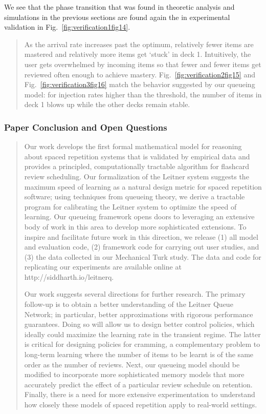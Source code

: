 We see that the phase transition that was found in theoretic analysis
and simulations in the previous sections are found again the in
experimental validation in Fig.~\ref{fig:verification1fig14}.

\begin{quote}
As the arrival rate increases past the optimum, relatively fewer items
are mastered and relatively more items get `stuck' in deck 1.
Intuitively, the user gets overwhelmed by incoming items so that fewer
and fewer items get reviewed often enough to achieve mastery.
Fig.~\ref{fig:verification2fig15} and Fig.~\ref{fig:verification3fig16}
match the behavior suggested by our queueing model: for injection rates
higher than the threshold, the number of items in deck 1 blows up while
the other decks remain stable.
\end{quote}

\subsubsection{Paper Conclusion and Open
Questions}\label{paper-conclusion-and-open-questions}

\begin{quote}
Our work develops the first formal mathematical model for reasoning
about spaced repetition systems that is validated by empirical data and
provides a principled, computationally tractable algorithm for flashcard
review scheduling. Our formalization of the Leitner system suggests the
maximum speed of learning as a natural design metric for spaced
repetition software; using techniques from queueing theory, we derive a
tractable program for calibrating the Leitner system to optimize the
speed of learning. Our queueing framework opens doors to leveraging an
extensive body of work in this area to develop more sophisticated
extensions. To inspire and facilitate future work in this direction, we
release (1) all model and evaluation code, (2) framework code for
carrying out user studies, and (3) the data collected in our Mechanical
Turk study. The data and code for replicating our experiments are
available online at http://siddharth.io/leitnerq.

Our work suggests several directions for further research. The primary
follow-up is to obtain a better understanding of the Leitner Queue
Network; in particular, better approximations with rigorous performance
guarantees. Doing so will allow us to design better control policies,
which ideally could maximize the learning rate in the transient regime.
The latter is critical for designing policies for cramming, a
complementary problem to long-term learning where the number of items to
be learnt is of the same order as the number of reviews. Next, our
queueing model should be modified to incorporate more sophisticated
memory models that more accurately predict the effect of a particular
review schedule on retention. Finally, there is a need for more
extensive experimentation to understand how closely these models of
spaced repetition apply to real-world settings.
\end{quote}

